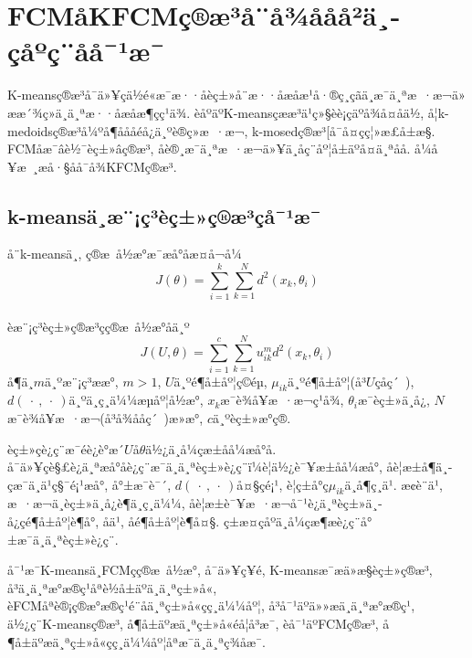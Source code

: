 \documentclass[lang=cn,11pt]{elegantpaper}
\begin{document}
\section{FCMåKFCMç®æ³å¨å¾ååå²ä¸­çåºç¨åå¯¹æ¯}

K-meansç®æ³å¯ä»¥çä½é«æ¯æ··åèç±»å¨æ··åæåæ¹å·®ç¸ç­ãä¸æ¯ä¸ªæ ·æ¬ä»ææ´¾ç»ä¸ä¸ªæ··åæåæ¶çç¹ä¾. èåºäºK-meansçææ³ä¹ç»§èè¡çäºå¾å¤åä½, å¦k-medoidsç®æ³\cite{RousseeuwPrincipal}å¼ºå¶åååéå¿ä¸ºè®­ç»æ ·æ¬, k-mosedç®æ³[\cite{JingPalladium}å¯å¤çç¦»æ£å±æ§. FCM\cite{Bezdek1981Pattern}åæ¯âè½¯èç±»âç®æ³, åè®¸æ¯ä¸ªæ ·æ¬ä»¥ä¸åç¨åº¦å±äºå¤ä¸ªåå. å¼å¥æ ¸æå·§åå¯å¾KFCMç®æ³. 
\subsection{k-meansä¸æ¨¡ç³èç±»ç®æ³çå¯¹æ¯}
å¨k-meansä¸­, ç®æ å½æ°æ¯æå°åæ­¤å¬å¼
\begin{equation*}
J(\theta)=\sum_{i=1}^k\sum_{k=1}^N d^2(x_k,\theta_i)
\end{equation*}
\\èæ¨¡ç³èç±»ç®æ³çç®æ å½æ°åä¸º
\begin{equation*}
	J(U,\theta)=\sum_{i=1}^c\sum_{k=1}^Nu_{ik}^m d^2(x_k,\theta_i)
\end{equation*}
å¶ä¸­$m$ä¸ºæ¨¡ç³ææ°, $m>1$, $U$ä¸ºé¶å±åº¦ç©éµ, $\mu_{ik}$ä¸ºé¶å±åº¦(å³$U$çåç´ ), 
\ $d(\ \cdot \ , \ \cdot \ )$ä¸ºä¸ç¸ä¼¼æµåº¦å½æ°, $x_k$æ¯è¾å¥æ ·æ¬ç¹å¾, $\theta_i$æ¯èç±»ä¸­å¿, $N$æ¯è¾å¥æ ·æ¬(å³å¾ååç´ )æ»æ°, $c$ä¸ºèç±»æ°ç®. 
\par èç±»çè¿ç¨æ¯éè¿è°æ´$U$å$\theta$ä½¿ä¸å¼çæ±åå¼æå°å. å¯ä»¥çè§£è¿ä¸ªæå°åè¿ç¨æ¯ä¸ä¸ªèç±»è¿ç¨ï¼è¦ä½¿è¯¥æ±åå¼æå°, åè¦æ±å¶ä¸­çæ¯ä¸ä¹ç§¯é¡¹æå°, å°±æ¯è¯´, $d(\ \cdot \ , \ \cdot \ )$å¤§çé¡¹, è¦ç±å°ç$\mu_{ik}$ä¸å¶ç¸ä¹. æ¢è¨ä¹, æ ·æ¬ä¸èç±»ä¸­å¿è¶ä¸ç¸ä¼¼, åè¦æ±è¯¥æ ·æ¬å¯¹è¿ä¸ªèç±»ä¸­å¿çé¶å±åº¦è¶å°, åä¹, åé¶å±åº¦è¶å¤§. ç±æ­¤çåºä¸å¼çæ¶æè¿ç¨å°±æ¯ä¸ä¸ªèç±»è¿ç¨. 
\par å¯¹æ¯K-meansä¸FCMçç®æ å½æ°, å¯ä»¥ç¥é, K-meansæ¯æä»æ§èç±»ç®æ³, å³ä¸ä¸ªæ°æ®ç¹åªè½å±äºä¸ä¸ªç±»å«, èFCMåªè®¡ç®æ°æ®ç¹é¨åä¸ªç±»å«çç¸ä¼¼åº¦, å³å¯¹äºä»»æä¸ä¸ªæ°æ®ç¹, ä½¿ç¨K-meansç®æ³, å¶å±äºæä¸ªç±»å«éå¦å³æ¯, èå¯¹äºFCMç®æ³, å¶å±äºæä¸ªç±»å«çç¸ä¼¼åº¦åªæ¯ä¸ä¸ªç¾åæ¯. 
\end{document}
